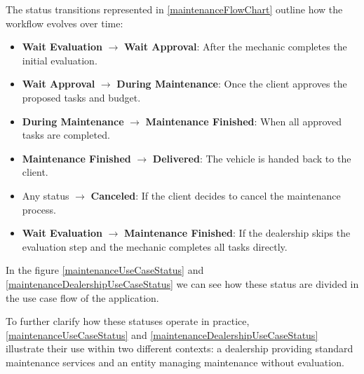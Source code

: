 The status transitions represented in \ref{maintenanceFlowChart} outline how the workflow evolves over time:
\begin{itemize}
    \item \textbf{Wait Evaluation} $\rightarrow$ \textbf{Wait Approval}: After the mechanic completes the initial evaluation.
    \item \textbf{Wait Approval} $\rightarrow$ \textbf{During Maintenance}: Once the client approves the proposed tasks and budget.
    \item \textbf{During Maintenance} $\rightarrow$ \textbf{Maintenance Finished}: When all approved tasks are completed.
    \item \textbf{Maintenance Finished} $\rightarrow$ \textbf{Delivered}: The vehicle is handed back to the client.
    \item Any status $\rightarrow$ \textbf{Canceled}: If the client decides to cancel the maintenance process.
    \item \textbf{Wait Evaluation} $\rightarrow$ \textbf{Maintenance Finished}: If the dealership skips the evaluation step and the mechanic completes all tasks directly.
\end{itemize}

In the figure \ref{maintenanceUseCaseStatus} and \ref{maintenanceDealershipUseCaseStatus} we can see how these status are divided in the use case flow of the application.

To further clarify how these statuses operate in practice, \ref{maintenanceUseCaseStatus} and \ref{maintenanceDealershipUseCaseStatus} illustrate their use within two different contexts: a dealership providing standard maintenance services and an entity managing maintenance without evaluation.


